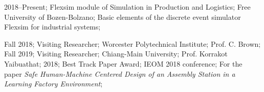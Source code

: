 \addteaching%
{%
    2018--Present;%
    Flexsim module of Simulation in Production and Logistics;%
    Free University of Bozen-Bolzano;%
    Basic elements of the discrete event simulator Flexsim for industrial systems;%
}%



\addvisit%
{%
    Fall 2018;%
    Visiting Researcher;%
    Worcester Polytechnical Institute;%
    Prof\@. C\@. Brown;%
}%
\addvisit%
{%
    Fall 2019;%
    Visiting Researcher;%
    Chiang-Main University;%
    Prof\@. Korrakot Yaibuathat;%
}%
\addhonour%
{%
    2018;%
    Best Track Paper Award;%
    IEOM 2018 conference;%
    For the paper \emph{Safe Human-Machine Centered Design of an Assembly Station in a Learning Factory Environment};%
}%
